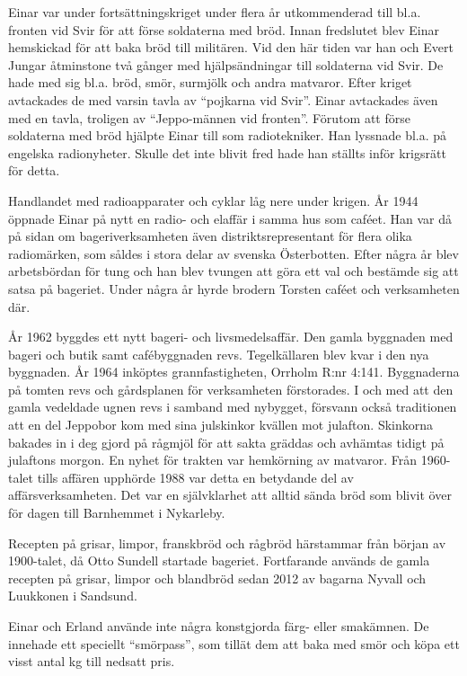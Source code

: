 Einar var under fortsättningskriget under flera år utkommenderad till bl.a. fronten vid Svir för att förse soldaterna med bröd. Innan fredslutet blev Einar hemskickad för att baka bröd till militären. Vid den här tiden var han och Evert Jungar åtminstone två gånger med hjälpsändningar till soldaterna vid Svir. De hade med sig bl.a. bröd, smör, surmjölk och andra matvaror. Efter kriget avtackades de med varsin tavla av ``pojkarna vid Svir''. Einar avtackades även med en tavla, troligen av ``Jeppo-männen vid fronten''. Förutom att förse soldaterna med bröd hjälpte Einar till som radiotekniker. Han lyssnade bl.a. på engelska radionyheter. Skulle det inte blivit fred hade han ställts inför krigsrätt för detta.

Handlandet med radioapparater och cyklar låg nere under krigen. År 1944 öppnade Einar på nytt en radio- och elaffär i samma hus som caféet. Han var då på sidan om bageriverksamheten även distriktsrepresentant för flera olika radiomärken, som såldes i stora delar av svenska Österbotten. Efter några år blev arbetsbördan för tung och han blev tvungen att göra ett val och bestämde sig att satsa på bageriet. Under några år hyrde brodern Torsten caféet och verksamheten där.

År 1962 byggdes ett nytt bageri- och livsmedelsaffär. Den gamla byggnaden med bageri och butik samt cafébyggnaden revs. Tegelkällaren blev kvar i den nya byggnaden.  År 1964 inköptes grannfastigheten, Orrholm R:nr 4:141. Byggnaderna på tomten revs och gårdsplanen för verksamheten förstorades. I och med att den gamla vedeldade ugnen revs i samband med nybygget, försvann också traditionen att en del Jeppobor kom med sina julskinkor kvällen mot julafton. Skinkorna bakades in i deg gjord på rågmjöl för att sakta gräddas och avhämtas tidigt på julaftons morgon. En nyhet för trakten var hemkörning av matvaror. Från 1960-talet tills affären upphörde 1988 var detta en betydande del av affärsverksamheten. Det var en självklarhet att alltid sända bröd som blivit över för dagen till Barnhemmet i Nykarleby.

Recepten på grisar, limpor, franskbröd och rågbröd härstammar från början av 1900-talet, då Otto Sundell startade bageriet. Fortfarande används de gamla recepten på grisar, limpor och blandbröd sedan 2012 av bagarna Nyvall och Luukkonen i Sandsund.

Einar och Erland använde inte några konstgjorda färg- eller smakämnen. De innehade ett speciellt ``smörpass'', som tillät dem att baka med smör och köpa ett visst antal kg till nedsatt pris.

